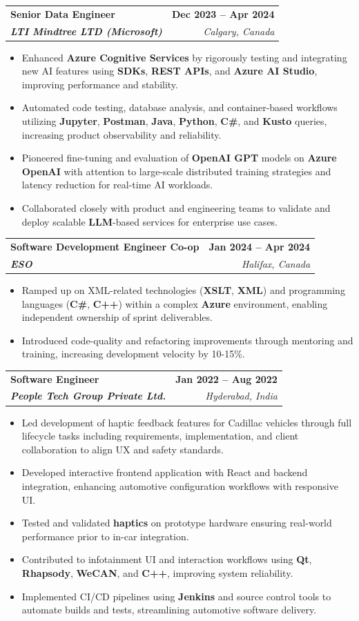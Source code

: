 \documentclass[letterpaper,11pt]{article}
\makeatletter
\newcommand{\resumeItem}[1]{
  \item\small{
    {#1 \vspace{-2pt}}
  }
}
\newcommand{\resumeSubheading}[4]{
  \vspace{-2pt}\item
    \begin{tabular*}{1.0\textwidth}[t]{l@{\extracolsep{\fill}}r}
      \textbf{#1} & \textbf{\small #2} \\
      \textit{\small#3} & \textit{\small #4} \\
    \end{tabular*}\vspace{-7pt}
}
\newcommand{\resumeItemListStart}{\begin{itemize}}
\newcommand{\resumeItemListEnd}{\end{itemize}\vspace{-5pt}}
\makeatother
\begin{document}
    \resumeSubheading
      {Senior Data Engineer}{\textbf{Dec 2023 -- Apr 2024}}
      {\textbf{LTI Mindtree LTD (Microsoft)}}{Calgary, Canada}
      \resumeItemListStart
        \resumeItem{Enhanced \textbf{Azure Cognitive Services} by rigorously testing and integrating new AI features using \textbf{SDKs}, \textbf{REST APIs}, and \textbf{Azure AI Studio}, improving performance and stability.}
        \resumeItem{Automated code testing, database analysis, and container-based workflows utilizing \textbf{Jupyter}, \textbf{Postman}, \textbf{Java}, \textbf{Python}, \textbf{C\#}, and \textbf{Kusto} queries, increasing product observability and reliability.}
        \resumeItem{Pioneered fine-tuning and evaluation of \textbf{OpenAI GPT} models on \textbf{Azure OpenAI} with attention to large-scale distributed training strategies and latency reduction for real-time AI workloads.}
        \resumeItem{Collaborated closely with product and engineering teams to validate and deploy scalable \textbf{LLM}-based services for enterprise use cases.}
      \resumeItemListEnd
    
    \resumeSubheading
      {Software Development Engineer Co-op}{\textbf{Jan 2024 -- Apr 2024}}
      {\textbf{ESO}}{Halifax, Canada}
      \resumeItemListStart
        \resumeItem{Ramped up on XML-related technologies (\textbf{XSLT}, \textbf{XML}) and programming languages (\textbf{C\#}, \textbf{C++}) within a complex \textbf{Azure} environment, enabling independent ownership of sprint deliverables.}
        \resumeItem{Introduced code-quality and refactoring improvements through mentoring and training, increasing development velocity by 10-15\%.}
      \resumeItemListEnd

    \resumeSubheading
      {Software Engineer}{\textbf{Jan 2022 -- Aug 2022}}
      {\textbf{People Tech Group Private Ltd.}}{Hyderabad, India}
      \resumeItemListStart
        \resumeItem{Led development of haptic feedback features for Cadillac vehicles through full lifecycle tasks including requirements, implementation, and client collaboration to align UX and safety standards.}
        \resumeItem{Developed interactive frontend application with React and backend integration, enhancing automotive configuration workflows with responsive UI.}
        \resumeItem{Tested and validated \textbf{haptics} on prototype hardware ensuring real-world performance prior to in-car integration.}
        \resumeItem{Contributed to infotainment UI and interaction workflows using \textbf{Qt}, \textbf{Rhapsody}, \textbf{WeCAN}, and \textbf{C++}, improving system reliability.}
        \resumeItem{Implemented CI/CD pipelines using \textbf{Jenkins} and source control tools to automate builds and tests, streamlining automotive software delivery.}
      \resumeItemListEnd
\end{document}
